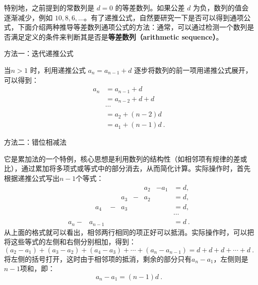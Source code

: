 特别地，之前提到的常数列是 $d = 0$ 的等差数列。如果公差 $d$ 为负，数列的值会逐渐减少，例如 $10, 8, 6, \dots$。有了递推公式，自然要研究一下是否可以得到通项公式，下面介绍两种推导等差数列通项公式的方法：通常，可以通过检测一个数列是否满足定义的条件来判断其是否是\textbf{等差数列（arithmetic sequence）}。

方法一：迭代递推公式

当$n>1$ 时，利用递推公式  $a_n = a_{n-1} + d$ 逐步将数列的前一项用递推公式展开，可以得到：
\begin{equation}\label{eq_HsAmPg_6}
\begin{aligned}
a_n &= a_{n-1} + d \\
&= a_{n-2}+d + d\\
&\cdots \\
&= a_2 + (n-2)d\\
&=  a_1 + (n-1)d~.
\end{aligned}
\end{equation}

方法二：错位相减法

它是累加法的一个特例，核心思想是利用数列的结构性（如相邻项有规律的差或比），通过累加将多项式或等式中的部分消去，从而简化计算。实际操作时，首先根据递推公式写出$n-1$个等式：
\begin{equation}\label{eq_HsAmPg_7}
\begin{split}
        &      &  &    & & a_2& -a_1 & = d, \\
        &      & & a_3 & -&a_2&      & = d, \\
        & \ \ \ \ a_4  &- &a_3& &    &      & = d, \\
        &        &    && &    &      &\cdots \\
a_n -   & a_{n-1}&   & & &    &      & = d~.
\end{split}
\end{equation}
从上面的格式就可以看出，相邻两行相同的项正好可以抵消。实际操作时，可以把将这些等式的左侧和右侧分别相加，得到：
\begin{equation}
(a_2 - a_1) + (a_3 - a_2) + (a_4 - a_3) + \cdots + (a_n - a_{n-1}) = d + d +d+ \cdots + d~.
\end{equation}
将左侧的括号打开，这时由于相邻项的抵消，剩余的部分只有$a_n-a_1$，左侧则是$n-1$项和，即：
\begin{equation}\label{eq_HsAmPg_8}
a_n -a_1=(n-1)d~.
\end{equation}

